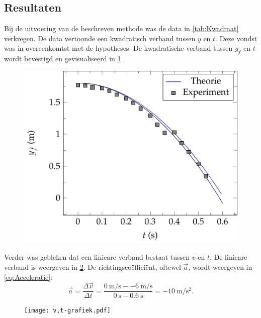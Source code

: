 \documentclass{scrartcl}
\begin{document}
\subsection{Resultaten}
Bij de uitvoering van de beschreven methode was de data in \cref{tab:Kwadraat} verkregen. De data vertoonde een kwadratisch verband tussen $y$ en $t$.  Deze vondst was in overeenkomtst met de hypotheses.
De kwadratische verband tussen $y_f$ en $t$ wordt bevestigd en gevisualiseerd in \cref{fig:kwadraat}.
\begin{figure}\label{fig:kwadraat}
\centering
\includegraphics[scale=1]{Grafiekvalbeweging.pdf}
\end{figure}
Verder was gebleken dat een linieare verband bestaat tussen $v$ en $t$. De linieare verband is weergeven in \cref{fig:liniear}. De richtingsco\"{e}ffici\"{e}nt, oftewel $\vec{a}$, wordt weergeven in \cref{eq:Acceleratie}:
\begin{equation}\label{eq:Acceleratie}
\vec{a}=\frac{\Delta \vec{v}}{\Delta t}=\frac{\SI{0}{\meter\per\second}-\SI{-6}{\meter\per\second}}{\SI{0}{\second}-\SI{0.6}{\second}}=\SI{-10}{\meter\per\second\squared}\mathrm{.}
\end{equation}
\begin{figure}[t]
\centering
\texttt{[image: v,t-grafiek.pdf]}
\label{fig:liniear}
\end{figure}
\end{document}
